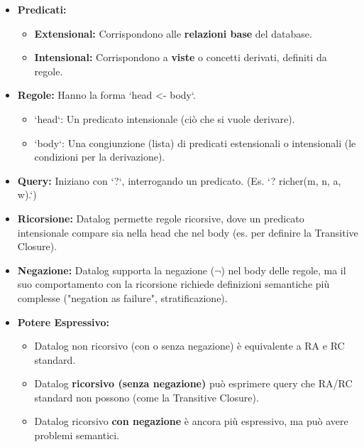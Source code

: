 \documentclass{article}
\begin{document}
	\begin{itemize}
		\item \textbf{Predicati:}
		\begin{itemize}
			\item \textbf{Extensional:} Corrispondono alle \textbf{relazioni base} del database.
			\item \textbf{Intensional:} Corrispondono a \textbf{viste} o concetti derivati, definiti da regole.
		\end{itemize}
		\item \textbf{Regole:} Hanno la forma `head <- body`.
		\begin{itemize}
			\item `head`: Un predicato intensionale (ciò che si vuole derivare).
			\item `body`: Una congiunzione (lista) di predicati estensionali o intensionali (le condizioni per la derivazione).
		\end{itemize}
		\item \textbf{Query:} Iniziano con `?`, interrogando un predicato. (Es. `? richer(m, n, a, w).`)
		\item \textbf{Ricorsione:} Datalog permette regole ricorsive, dove un predicato intensionale compare sia nella head che nel body (es. per definire la Transitive Closure).
		\item \textbf{Negazione:} Datalog supporta la negazione ($\neg$) nel body delle regole, ma il suo comportamento con la ricorsione richiede definizioni semantiche più complesse ("negation as failure", stratificazione).
		\item \textbf{Potere Espressivo:}
		\begin{itemize}
			\item Datalog non ricorsivo (con o senza negazione) è equivalente a RA e RC standard.
			\item Datalog \textbf{ricorsivo (senza negazione)} può esprimere query che RA/RC standard non possono (come la Transitive Closure).
			\item Datalog ricorsivo \textbf{con negazione} è ancora più espressivo, ma può avere problemi semantici.
		\end{itemize}
	\end{itemize}
	
	
\end{document}
